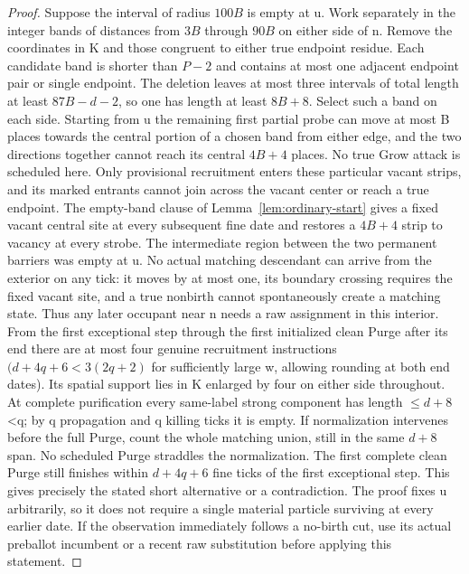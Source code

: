 \begin{proof}
Suppose the interval of radius \(100B\) is empty at u. Work separately in the integer bands of distances from \(3B\) through \(90B\) on either side of n. Remove the coordinates in K and those congruent to either true endpoint residue. Each candidate band is shorter than \(P- 2\) and contains at most one adjacent endpoint pair or single endpoint. The deletion leaves at most three intervals of total length at least \(87B- d- 2\), so one has length at least \(8B+8\). Select such a band on each side. Starting from u the remaining first partial probe can move at most B places towards the central portion of a chosen band from either edge, and the two directions together cannot reach its central \(4B+4\) places. No true Grow attack is scheduled here. Only provisional recruitment enters these particular vacant strips, and its marked entrants cannot join across the vacant center or reach a true endpoint. The empty-band clause of Lemma~\ref{lem:ordinary-start} gives a fixed vacant central site at every subsequent fine date and restores a \(4B+4\) strip to vacancy at every strobe. The intermediate region between the two permanent barriers was empty at u. No actual matching descendant can arrive from the exterior on any tick: it moves by at most one, its boundary crossing requires the fixed vacant site, and a true nonbirth cannot spontaneously create a matching state. Thus any later occupant near n needs a raw assignment in this interior. From the first exceptional step through the first initialized clean Purge after its end there are at most four genuine recruitment instructions \((d+4q+6<3(2q+2)\) for sufficiently large w, allowing rounding at both end dates). Its spatial support lies in K enlarged by four on either side throughout. At complete purification every same-label strong component has length \(\le\)\(d+8\)\textless{}q; by q propagation and q killing ticks it is empty. If normalization intervenes before the full Purge, count the whole matching union, still in the same \(d+8\) span. No scheduled Purge straddles the normalization. The first complete clean Purge still finishes within \(d+4q+6\) fine ticks of the first exceptional step. This gives precisely the stated short alternative or a contradiction. The proof fixes u arbitrarily, so it does not require a single material particle surviving at every earlier date. If the observation immediately follows a no-birth cut, use its actual preballot incumbent or a recent raw substitution before applying this statement.


\end{proof}
